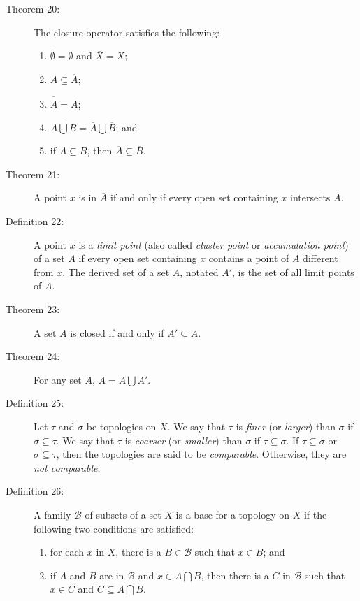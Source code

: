 \documentclass{article}
\begin{document}
\begin{description}
  \item[Theorem 20:] The closure operator satisfies the following:
    \begin{enumerate}[\hspace{1cm}1.]
      \item $\overline{\emptyset} = \emptyset$ and $\overline{X}=X$;
      \item $A \subseteq \overline{A}$;
      \item $\overline{\overline{A}} = \overline{A}$;
      \item $\overline{A \bigcup B} = \overline{A} \bigcup \overline{B}$; and
      \item if $A \subseteq B$, then $\overline{A} \subseteq \overline{B}$.
    \end{enumerate}

  \item[Theorem 21:] A point $x$ is in $\overline{A}$ if and only if every open set containing $x$ intersects $A$.

  \item[Definition 22:] A point $x$ is a \emph{limit point} (also called \emph{cluster point} or \emph{accumulation point}) of a set $A$ if every open set containing $x$ contains a point of $A$ different from $x$. The derived set of a set $A$, notated $A'$, is the set of all limit points of $A$.

  \item[Theorem 23:] A set $A$ is closed if and only if $A' \subseteq A$.

  \item[Theorem 24:] For any set $A$, $\overline{A} = A \bigcup A'$.

  \item[Definition 25:] Let $\tau$ and $\sigma$ be topologies on $X$. We say that $\tau$ is \emph{finer} (or \emph{larger}) than $\sigma$ if $\sigma \subseteq \tau$. We say that $\tau$ is \emph{coarser} (or \emph{smaller}) than $\sigma$ if $\tau \subseteq \sigma$. If $\tau \subseteq \sigma$ or $\sigma \subseteq \tau$, then the topologies are said to be \emph{comparable}. Otherwise, they are \emph{not comparable}.

  \item[Definition 26:] A family $\mathcal{B}$ of subsets of a set $X$ is a base for a topology on $X$ if the following two conditions are satisfied:
    \begin{enumerate}[\hspace{1cm}1.]
      \item for each $x$ in $X$, there is a $B \in \mathcal{B}$ such that $x \in B$; and
      \item if $A$ and $B$ are in $\mathcal{B}$ and $x \in A\bigcap B$, then there is a $C$ in $\mathcal{B}$ such that $x \in C$ and $C \subseteq A \bigcap B$.
    \end{enumerate}


\end{description}
\end{document}
